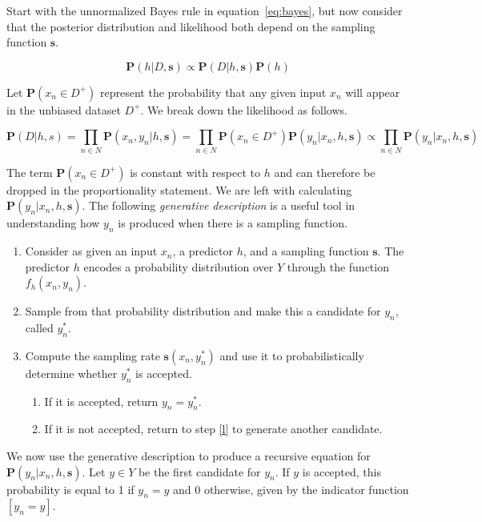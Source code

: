 \documentclass[twoside]{article}
\begin{document}
Start with the unnormalized Bayes rule in equation~\eqref{eq:bayes}, but now consider that the posterior distribution and likelihood both depend on the sampling function \(\mathbf{s}\).

\[\mathbf{P}(h|D,\mathbf{s})\propto\mathbf{P}(D|h,\mathbf{s})\mathbf{P}(h)\]

Let \(\mathbf{P}(x_n \in D^+)\) represent the probability that any given input \(x_n\) will appear in the unbiased dataset \(D^+\). We break down the likelihood as follows.

\[\mathbf{P}(D|h,s)=\prod_{n \in N} \mathbf{P}(x_n,y_n|h,\mathbf{s})=\prod_{n \in N} \mathbf{P}(x_n \in D^+)\mathbf{P}(y_n|x_n,h,\mathbf{s})\propto\prod_{n \in N}\mathbf{P}(y_n|x_n,h,\mathbf{s})\]

The term \(\mathbf{P}(x_n \in D^+)\) is constant with respect to \(h\) and can therefore be dropped in the proportionality statement. We are left with calculating \(\mathbf{P}(y_n|x_n,h,\mathbf{s})\). The following \textit{generative description} is a useful tool in understanding how \(y_n\) is produced when there is a sampling function.

\begin{enumerate}
	\item Consider as given an input \(x_n\), a predictor \(h\), and a sampling function \(\mathbf{s}\). The predictor \(h\) encodes a probability distribution over \(Y\) through the function \(f_h(x_n,y_n)\).
	\item \label{l} Sample from that probability distribution and make this a candidate for \(y_n\), called \(y_n^*\).
	\item Compute the sampling rate \(\mathbf{s}(x_n,y_n^*)\) and use it to probabilistically determine whether \(y_n^*\) is accepted.
    \begin{enumerate}
        \item If it is accepted, return \(y_n=y_n^*\).
        \item If it is not accepted, return to step \ref{l} to generate another candidate.
    \end{enumerate}
\end{enumerate}

We now use the generative description to produce a recursive equation for \(\mathbf{P}(y_n|x_n,h,\mathbf{s})\). Let \(y \in Y\) be the first candidate for \(y_n\). If \(y\) is accepted, this probability is equal to 1 if \(y_n = y\) and 0 otherwise, given by the indicator function \(\left [y_n = y\right ]\).
\end{document}
